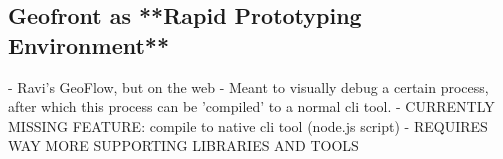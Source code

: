 















\subsection{Geofront as **Rapid Prototyping Environment**} 
  - Ravi's GeoFlow, but on the web
    - Meant to visually debug a certain process, after which this process can be 'compiled' to a normal cli tool.
  - CURRENTLY MISSING FEATURE: compile to native cli tool (node.js script)
  - REQUIRES WAY MORE SUPPORTING LIBRARIES AND TOOLS
